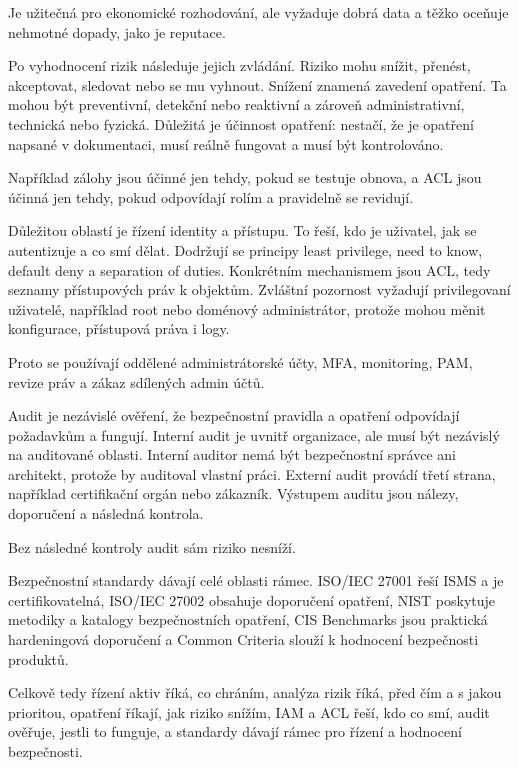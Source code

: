 \documentclass[11pt,a4paper]{article}
\begin{document}
Je užitečná pro ekonomické rozhodování, ale vyžaduje dobrá data a těžko oceňuje nehmotné dopady, jako je reputace.

Po vyhodnocení rizik následuje jejich zvládání. Riziko mohu snížit, přenést, akceptovat, sledovat nebo se mu vyhnout. Snížení znamená zavedení opatření. Ta mohou být preventivní, detekční nebo reaktivní a zároveň administrativní, technická nebo fyzická. Důležitá je účinnost opatření: nestačí, že je opatření napsané v dokumentaci, musí reálně fungovat a musí být kontrolováno.

Například zálohy jsou účinné jen tehdy, pokud se testuje obnova, a ACL jsou účinná jen tehdy, pokud odpovídají rolím a pravidelně se revidují.

Důležitou oblastí je řízení identity a přístupu. To řeší, kdo je uživatel, jak se autentizuje a co smí dělat. Dodržují se principy least privilege, need to know, default deny a separation of duties. Konkrétním mechanismem jsou ACL, tedy seznamy přístupových práv k objektům. Zvláštní pozornost vyžadují privilegovaní uživatelé, například root nebo doménový administrátor, protože mohou měnit konfigurace, přístupová práva i logy.

Proto se používají oddělené administrátorské účty, MFA, monitoring, PAM, revize práv a zákaz sdílených admin účtů.

Audit je nezávislé ověření, že bezpečnostní pravidla a opatření odpovídají požadavkům a fungují. Interní audit je uvnitř organizace, ale musí být nezávislý na auditované oblasti. Interní auditor nemá být bezpečnostní správce ani architekt, protože by auditoval vlastní práci. Externí audit provádí třetí strana, například certifikační orgán nebo zákazník. Výstupem auditu jsou nálezy, doporučení a následná kontrola.

Bez následné kontroly audit sám riziko nesníží.

Bezpečnostní standardy dávají celé oblasti rámec. ISO/IEC 27001 řeší ISMS a je certifikovatelná, ISO/IEC 27002 obsahuje doporučení opatření, NIST poskytuje metodiky a katalogy bezpečnostních opatření, CIS Benchmarks jsou praktická hardeningová doporučení a Common Criteria slouží k hodnocení bezpečnosti produktů.

Celkově tedy řízení aktiv říká, co chráním, analýza rizik říká, před čím a s jakou prioritou, opatření říkají, jak riziko snížím, IAM a ACL řeší, kdo co smí, audit ověřuje, jestli to funguje, a standardy dávají rámec pro řízení a hodnocení bezpečnosti.
\end{document}
